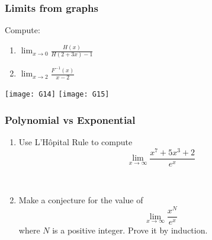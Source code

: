\documentclass[14pt]{beamer}
\newcommand{\p}{\pause}
\begin{document}
	\begin{frame}[t]
		\frametitle{Limits from graphs}

		Compute:

		\begin{multicols}{2}
			\begin{enumerate}
				\item ${\displaystyle \lim_{x\to 0 } \frac{H(x)}{H(2+3x) - 1} }$

				\item ${\displaystyle \lim_{x \to 2} \frac{F^{-1}(x)}{x-2}}$
			\end{enumerate}
		\end{multicols}

		\medskip
		\texttt{[image: G14]}
		\hfill
		\texttt{[image: G15]}
	\end{frame}
	\begin{frame}[t]
		\frametitle{Polynomial vs Exponential}

		\begin{enumerate}
			\item Use L'H\^{o}pital Rule to compute
				\[
					\lim_{x \to \infty}\frac{x^{7} + 5x^{3}+2}{e^{x}}
				\]

				\ \p

			\item Make a conjecture for the value of
				\[
					\lim_{x \to \infty}\frac{x^{N}}{e^{x}}
				\]
				where $N$ is a positive integer. Prove it by induction.
		\end{enumerate}
	\end{frame}
\end{document}
